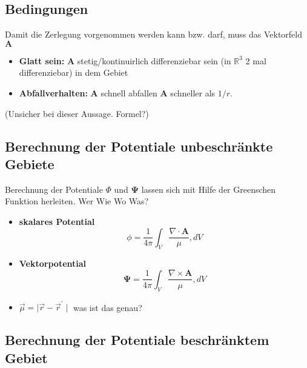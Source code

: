 \subsection{Bedingungen
\label{helmholtz:subsection:Bedingung}}

Damit die Zerlegung vorgenommen werden kann bzw. darf, muss das Vektorfeld $\mathbf{A}$ 

\begin{itemize}
\item \textbf{Glatt sein:} $\mathbf{A}$ stetig/kontinuirlich differenziebar sein (in $\mathbb{R}^3$ 2 mal differenziebar) in dem Gebiet
\item \textbf{Abfallverhalten:} $\mathbf{A}$ schnell abfallen  $\mathbf{A}$ schneller als $1/r$. 
\end{itemize}
(Unsicher bei dieser Aussage. Formel?)


\subsection{Berechnung der Potentiale unbeschränkte Gebiete
\label{helmholtz:subsection:Berechnung}}


Berechnung der Potentiale $\Phi $ und $\mathbf{\Psi}$ lassen sich mit Hilfe der Greenschen Funktion herleiten. Wer Wie Wo Was?


\begin{itemize}
\item \textbf{skalares Potential}
\begin{equation}
\phi = \frac{1}{4 \pi} \int_{V} \frac{\nabla \cdot \mathbf{A}}{\mu}, dV
\end{equation}
\item \textbf{Vektorpotential}
\begin{equation}
\mathbf{\Psi} = \frac{1}{4 \pi} \int_{V} \frac{\nabla \times \mathbf{A}}{\mu}, dV
\end{equation}
\item $\vec{\mu} = \mid \vec{r} - \vec{r}^{\prime} \mid$ was ist das genau?
\end{itemize}

\subsection{Berechnung der Potentiale beschränktem Gebiet
\label{helmholtz:subsection:BerechnungBeschr}}

